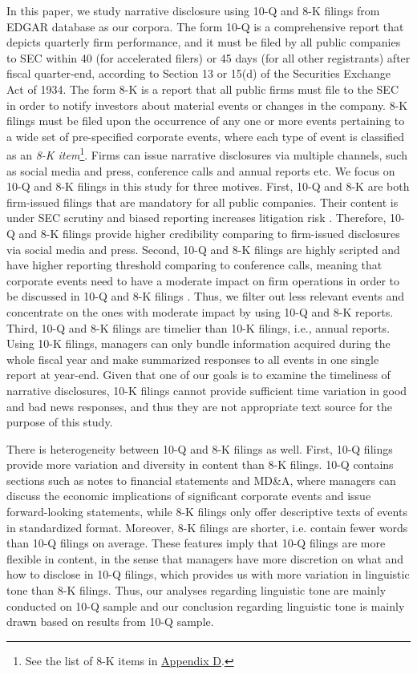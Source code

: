 \documentclass[a4paper]{article}
\begin{document}
\begin{spacing}{2}
In this paper, we study narrative disclosure using 10-Q and 8-K filings from EDGAR database as our corpora. The form 10-Q is a comprehensive report that depicts quarterly firm performance, and it must be filed by all public companies to SEC within 40 (for accelerated filers) or 45 days (for all other registrants) after fiscal quarter-end, according to Section 13 or 15(d) of the Securities Exchange Act of 1934. The form 8-K is a report that all public firms must file to the SEC in order to notify investors about material events or changes in the company. 8-K filings must be filed upon the occurrence of any one or more events pertaining to a wide set of pre-specified corporate events, where each type of event is classified as an \textit{8-K item}\footnote{See the list of 8-K items in \hyperref[appd]{Appendix D}.}. Firms can issue narrative disclosures via multiple channels, such as social media and press, conference calls and annual reports etc. We focus on 10-Q and 8-K filings in this study for three motives. First, 10-Q and 8-K are both firm-issued filings that are mandatory for all public companies. Their content is under SEC scrutiny and biased reporting increases litigation risk \citep*{rogersDisclosureToneShareholder2011, cazierWhenAreFirms2020}. Therefore, 10-Q and 8-K filings provide higher credibility comparing to firm-issued disclosures via social media and press. Second, 10-Q and 8-K filings are highly scripted and have higher reporting threshold comparing to conference calls, meaning that corporate events need to have a moderate impact on firm operations in order to be discussed in 10-Q and 8-K filings \citep*{hassanFirmLevelPoliticalRisk2019}. Thus, we filter out less relevant events and concentrate on the ones with moderate impact by using 10-Q and 8-K reports. Third, 10-Q and 8-K filings are timelier than 10-K filings, i.e., annual reports. Using 10-K filings, managers can only bundle information acquired during the whole fiscal year and make summarized responses to all events in one single report at year-end. Given that one of our goals is to examine the timeliness of narrative disclosures, 10-K filings cannot provide sufficient time variation in good and bad news responses, and thus they are not appropriate text source for the purpose of this study.

There is heterogeneity between 10-Q and 8-K filings as well. First, 10-Q filings provide more variation and diversity in content than 8-K filings. 10-Q contains sections such as notes to financial statements and MD\&A, where managers can discuss the economic implications of significant corporate events and issue forward-looking statements, while 8-K filings only offer descriptive texts of events in standardized format. Moreover, 8-K filings are shorter, i.e. contain fewer words than 10-Q filings on average. These features imply that 10-Q filings are more flexible in content, in the sense that managers have more discretion on what and how to disclose in 10-Q filings, which provides us with more variation in linguistic tone than 8-K filings. Thus, our analyses regarding linguistic tone are mainly conducted on 10-Q sample and our conclusion regarding linguistic tone is mainly drawn based on results from 10-Q sample. 


\end{spacing}
\end{document}
